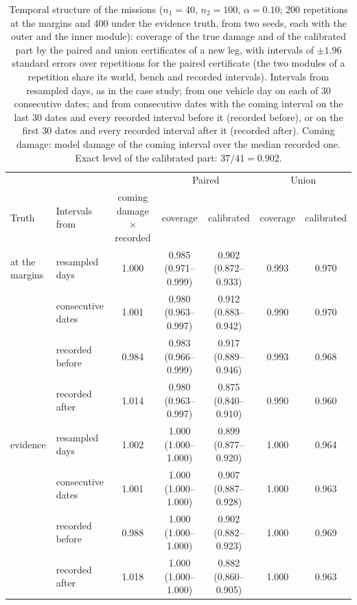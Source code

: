 \begin{table}[htbp]
\centering
\caption{Temporal structure of the missions ($n_1=40$, $n_2=100$, $\alpha=0.10$; 200 repetitions at the margins and 400 under the evidence truth, from two seeds, each with
the outer and the inner module): coverage of the true damage and of the calibrated part by the paired and union
certificates of a new leg, with intervals of $\pm1.96$ standard errors over repetitions for the paired certificate (the
two modules of a repetition share its world, bench and recorded intervals). Intervals from resampled days, as in
the case study; from one vehicle day on each of 30 consecutive dates; and from consecutive dates with the coming
interval on the last 30 dates and every recorded interval before it (recorded before), or on the first 30 dates and
every recorded interval after it (recorded after). Coming damage: model damage of the coming interval over the median
recorded one. Exact level of the calibrated part: $37/41=0.902$.}
\label{tab:S3}
\footnotesize
\setlength{\tabcolsep}{3pt}
\begin{tabular*}{\textwidth}{@{\extracolsep{\fill}}llccccc@{}}
\toprule
& & & \multicolumn{2}{c}{Paired} & \multicolumn{2}{c}{Union} \\
\cmidrule(lr){4-5}\cmidrule(l){6-7}
Truth & Intervals from & \makecell{coming damage\\$\times$ recorded} & coverage & calibrated & coverage & calibrated \\
\midrule
at the margins & resampled days & 1.000 & 0.985 (0.971--0.999) & 0.902 (0.872--0.933) & 0.993 & 0.970 \\
 & consecutive dates & 1.001 & 0.980 (0.963--0.997) & 0.912 (0.883--0.942) & 0.990 & 0.970 \\
 & recorded before & 0.984 & 0.983 (0.966--0.999) & 0.917 (0.889--0.946) & 0.993 & 0.968 \\
 & recorded after & 1.014 & 0.980 (0.963--0.997) & 0.875 (0.840--0.910) & 0.990 & 0.960 \\
\addlinespace
evidence & resampled days & 1.002 & 1.000 (1.000--1.000) & 0.899 (0.877--0.920) & 1.000 & 0.964 \\
 & consecutive dates & 1.001 & 1.000 (1.000--1.000) & 0.907 (0.887--0.928) & 1.000 & 0.963 \\
 & recorded before & 0.988 & 1.000 (1.000--1.000) & 0.902 (0.882--0.923) & 1.000 & 0.969 \\
 & recorded after & 1.018 & 1.000 (1.000--1.000) & 0.882 (0.860--0.905) & 1.000 & 0.963 \\
\bottomrule
\end{tabular*}
\end{table}
